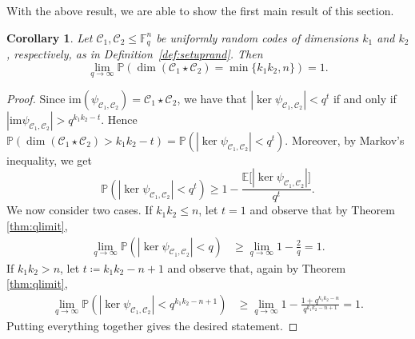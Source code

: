 \documentclass[a4paper,11pt,reqno]{article}
\newcommand{\F}{\mathbb{F}}
\newcommand{\E}{\mathbb E}
\newcommand{\C}{\mathcal{C}}
\newcommand{\im}{\mathrm{im}}
\renewcommand{\Pr}{\mathbb{P}}
\theoremstyle{plain} \numberwithin{equation}{section}
\newtheorem{corollary}[theorem]{Corollary}
\theoremstyle{definition}
\begin{document}
With the above result, we are able to show the first main result of this section. 

\begin{corollary} \label{cor:randomcodesinq}
    Let $\C_1, \C_2 \leq \F_q^n$ be uniformly random codes of dimensions $k_1$ and $k_2$, respectively, as in Definition~\ref{def:setuprand}. Then 
 $$\lim_{q \rightarrow \infty} \Pr(  \dim (\C_1\star\C_2) = \min\{k_1k_2, n\}) = 1.$$
\end{corollary}

\begin{proof}
Since $\im (\psi_{\C_1, \C_2}) = \C_1 \star \C_2$, we have that $|\ker \psi_{\C_1, \C_2}| < q^t$ if and only if $|\im \psi_{\C_1, \C_2}| > q^{k_1k_2 -t}$.
Hence $\Pr( \dim(\C_1 \star \C_2) > k_1k_2- t)  = \Pr(|\ker \psi_{\C_1, \C_2}| < q^t).$
Moreover, by Markov's inequality, we get $$\Pr(|\ker \psi_{\C_1, \C_2}| < q^t) \geq 1- \frac{\E\big[|\ker \psi_{\C_1, \C_2}|\big]}{q^t}.$$
We now consider two cases. If $k_1k_2 \leq n$, let $t=1$ and observe that by Theorem \ref{thm:qlimit}, 
\begin{align*}
   \lim_{q \rightarrow\infty} \Pr(|\ker \psi_{\C_1, \C_2}| < q) &\geq \lim_{q \rightarrow \infty}1 - \frac{2}{q} = 1.
\end{align*}
If $k_1k_2 > n$, let $t \coloneqq k_1k_2-n+1$ and observe that, again by Theorem \ref{thm:qlimit},  
\begin{align*}
   \lim_{q \rightarrow\infty} \Pr(|\ker \psi_{\C_1, \C_2}| < q^{k_1k_2-n+1}) &\geq \lim_{q \rightarrow \infty}1 - \frac{1 + q^{k_1k_2-n}}{q^{k_1k_2-n+1}} = 1.
\end{align*}
Putting everything together gives the desired statement.
\end{proof}
\end{document}
